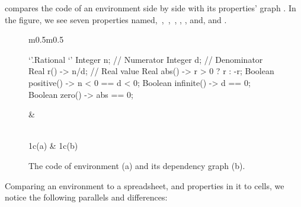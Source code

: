  compares the \Reap code of an environment side by side
with its properties' graph . In the figure, we see seven properties
named,~,~,~, , , and,  and
.

\begin{figure}
  \caption{\label{figure:rational}%
    The \Reap code of environment  (a) and
    its dependency graph (b).
  }
  \begin{tabular}{m{}m{}}
    \begin{minipage}[t]{\columnwidth}
    \begin{reap}
    `'.Rational {`'
    Integer n; // Numerator
    Integer d; // Denominator
    Real r() -> n/d; // Real value
    Real abs() -> r > 0 ? r : -r;
    Boolean positive() -> n < 0 == d < 0;
    Boolean infinite() -> d == 0;
    Boolean zero() -> abs == 0;
    }
    \end{reap}
    \end{minipage}
    &
    \begin{minipage}[t]{0.5\columnwidth}
    \begin{adjustbox}{width=\columnwidth}
    
    \end{adjustbox}
    \end{minipage}
      \\ \multicolumn1c{(a)} & \multicolumn1c{(b)}
  \end{tabular}
\end{figure}


Comparing an environment to a spreadsheet, and properties in it to cells, we
notice the following parallels and differences:


